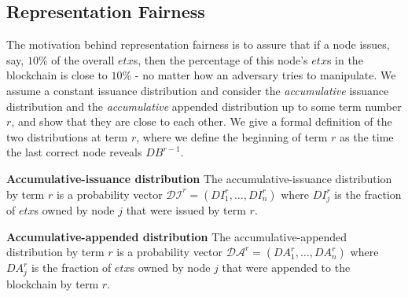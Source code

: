 \subsection{Representation Fairness}\label{subsec:repfair}
The motivation behind representation fairness is to assure that if a node issues, say, $10\%$ of the overall $etx$s, then the percentage of this node's $etx$s in the blockchain is close to $10\%$ - no matter how an adversary tries to manipulate. 
We assume a constant issuance distribution and consider the \emph{accumulative} issuance distribution and the \emph{accumulative} appended distribution up to some term number $r$, and show that they are close to each other. We give a formal definition of the two distributions at term $r$, where we define the beginning of term $r$ as the time the last correct node reveals $DB^{r-1}$.
\begin{definition}{\textbf{Accumulative-issuance distribution}} \label{def:rep_iss} The accumulative-issuance distribution by term $r$ is a probability vector $\mathcal{DI}^r=(DI_1^r,\dots,DI_n^r)$ where $DI_j^r$ is the fraction of $etx$s owned by node $j$ that were issued by term $r$. 
\end{definition}

\begin{definition}{\textbf{Accumulative-appended distribution}} The accumulative-appended distribution by term $r$ is a probability vector $\mathcal{DA}^r=\left(DA^r_1,\dots , DA^r_n \right )$ where $DA_j^r$ is the fraction of $etx$s owned by node $j$ that were appended to the blockchain by term $r$. 
\end{definition}

